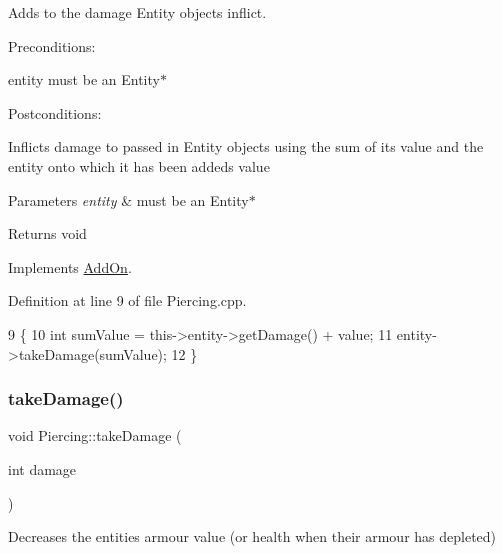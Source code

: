 Adds to the damage Entity objects inflict. 

Preconditions\+:
\begin{DoxyItemize}
\item entity must be an Entity$\ast$
\end{DoxyItemize}

Postconditions\+:
\begin{DoxyItemize}
\item Inflicts damage to passed in Entity objects using the sum of it\textquotesingle{}s value and the entity onto which it has been added\textquotesingle{}s value
\end{DoxyItemize}


\begin{DoxyParams}{Parameters}
{\em entity} & must be an Entity$\ast$ \\
\hline
\end{DoxyParams}
\begin{DoxyReturn}{Returns}
void 
\end{DoxyReturn}


Implements \hyperlink{classAddOn_aff1f4fa0fb368bbc49838df9c9ddba9c}{Add\+On}.



Definition at line 9 of file Piercing.\+cpp.


\begin{DoxyCode}
9                                         \{
10     \textcolor{keywordtype}{int} sumValue = this->entity->getDamage() + value;
11     entity->takeDamage(sumValue);
12 \}
\end{DoxyCode}
\mbox{\label{classPiercing_a103634469a43e1662bd5e07e66901667}} 
\subsubsection{\texorpdfstring{take\+Damage()}{takeDamage()}}
{\footnotesize\ttfamily void Piercing\+::take\+Damage (\begin{DoxyParamCaption}\item[{int}]{damage }\end{DoxyParamCaption})\hspace{0.3cm}{\ttfamily [virtual]}}



Decreases the entities\textquotesingle{} armour value (or health when their armour has depleted) 


